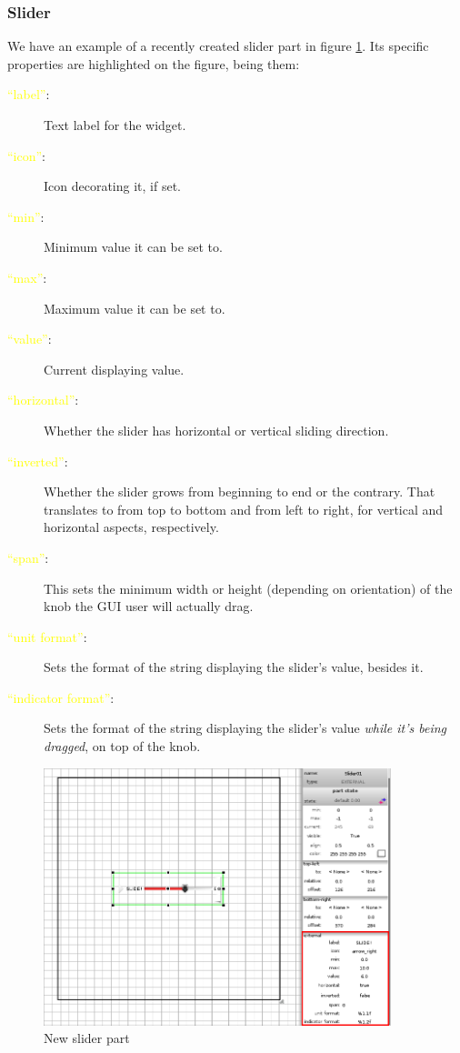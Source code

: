 \documentclass[a4paper]{profusion}
\newcommand{\GUIEditable}[1]{\textcolor{yellow}{#1}} %
\begin{document}
\subsubsection{Slider}

We have an example of a recently created slider part in figure
\ref{fig:new_slider}. Its specific properties are highlighted on the
figure, being them:

\begin{description}
  \item[\GUIEditable{``label''}:] Text label for the widget.
  \item[\GUIEditable{``icon''}:] Icon decorating it, if set.
  \item[\GUIEditable{``min''}:] Minimum value it can be set to.
  \item[\GUIEditable{``max''}:] Maximum value it can be set to.
  \item[\GUIEditable{``value''}:] Current displaying value.
  \item[\GUIEditable{``horizontal''}:] Whether the slider has
    horizontal or vertical sliding direction.
  \item[\GUIEditable{``inverted''}:] Whether the slider grows from
    beginning to end or the contrary. That translates to from top to
    bottom and from left to right, for vertical and horizontal
    aspects, respectively.
  \item[\GUIEditable{``span''}:] This sets the minimum width or height
    (depending on orientation) of the knob the GUI user will actually
    drag.
  \item[\GUIEditable{``unit format''}:] Sets the format of the string
    displaying the slider's value, besides it.
  \item[\GUIEditable{``indicator format''}:] Sets the format of the
    string displaying the slider's value \emph{while it's being
      dragged}, on top of the knob.
\end{description}

\begin{figure}[h!]
  \centering
  \includegraphics[width=0.9\textwidth]{images/new_slider.png}
  \caption{New slider part}
  \label{fig:new_slider}
\end{figure}
\end{document}
